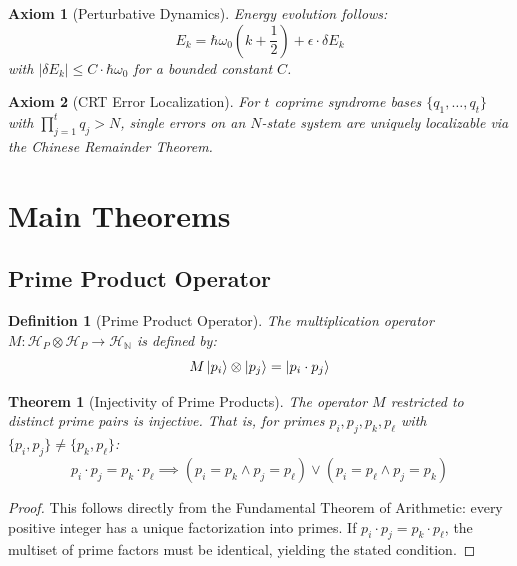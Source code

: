 \documentclass[12pt,a4paper]{article}
\newtheorem{definition}{Definition}[section]
\newtheorem{theorem}{Theorem}[section]
\newtheorem{axiom}{Axiom}
\begin{document}
\begin{axiom}[Perturbative Dynamics]
\label{ax:dynamics}
Energy evolution follows:
\begin{equation}
    E_k = \hbar\omega_0 \left(k + \frac{1}{2}\right) + \epsilon \cdot \delta E_k
\end{equation}
with $|\delta E_k| \leq C \cdot \hbar\omega_0$ for a bounded constant $C$.
\end{axiom}

\begin{axiom}[CRT Error Localization]
\label{ax:crt}
For $t$ coprime syndrome bases $\{q_1, \ldots, q_t\}$ with $\prod_{j=1}^t q_j > N$, single errors on an $N$-state system are uniquely localizable via the Chinese Remainder Theorem.
\end{axiom}

\section{Main Theorems}
\label{sec:theorems}

\subsection{Prime Product Operator}

\begin{definition}[Prime Product Operator]
The multiplication operator $M: \mathcal{H}_P \otimes \mathcal{H}_P \to \mathcal{H}_{\mathbb{N}}$ is defined by:
\begin{equation}
    M\ket{p_i} \otimes \ket{p_j} = \ket{p_i \cdot p_j}
\end{equation}
\end{definition}

\begin{theorem}[Injectivity of Prime Products]
\label{thm:injectivity}
The operator $M$ restricted to distinct prime pairs is injective. That is, for primes $p_i, p_j, p_k, p_\ell$ with $\{p_i, p_j\} \neq \{p_k, p_\ell\}$:
\begin{equation}
    p_i \cdot p_j = p_k \cdot p_\ell \implies (p_i = p_k \land p_j = p_\ell) \lor (p_i = p_\ell \land p_j = p_k)
\end{equation}
\end{theorem}

\begin{proof}
This follows directly from the Fundamental Theorem of Arithmetic: every positive integer has a unique factorization into primes. If $p_i \cdot p_j = p_k \cdot p_\ell$, the multiset of prime factors must be identical, yielding the stated condition.
\end{proof}
\end{document}
